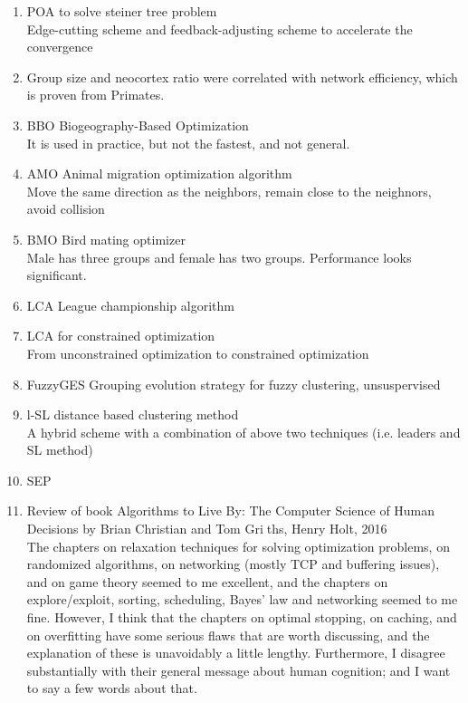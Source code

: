 \documentclass[a4paper,12pt]{article}
\begin{document}
\begin{enumerate}
	\item POA to solve steiner tree problem \cite{Liu_Physarum_2015}
	\\Edge-cutting scheme and feedback-adjusting scheme to accelerate the convergence
	
	\item Group size and neocortex ratio were correlated with network efficiency, which is proven from Primates. \cite{Pasquaretta_Social_2014}
		
	\item BBO Biogeography-Based Optimization\cite{Simon_Biogeography_2008}
	\\It is used in practice, but not the fastest, and not general.
	
	\item AMO Animal migration optimization algorithm \cite{Li_Animal_2014}
	\\Move the same direction as the neighbors, remain close to the neighnors, avoid collision

 	\item BMO Bird mating optimizer\cite{Askarzadeh_Bird_2014}
 	\\Male has three groups and female has two groups. Performance looks significant.
 	
	\item  LCA League championship algorithm \cite{Kashan_League_2009}
 	
	\item LCA  for constrained optimization\cite{Kashan_An_2011}
 	\\From unconstrained optimization to constrained optimization

 	\item  FuzzyGES Grouping evolution strategy for fuzzy clustering, unsuspervised \cite{Kashan_An_2013}

	\item l-SL distance based clustering method\cite{Patra_A_2011}
	\\A hybrid scheme with a combination of above two techniques (i.e. leaders and SL method)

 	\item SEP\cite{Gurrutxaga_SEP_2010}	
 
	\item Review of book   Algorithms  to  Live  By:  The  Computer  Science  of  Human  Decisions by  Brian  Christian  and  Tom  Griths,  Henry  Holt, 2016 \cite{Davis_Algorithms_2016}
	\\The  chapters  on  relaxation  techniques  for  solving  optimization  problems,  on  randomized  algorithms,  on  networking  (mostly  TCP  and  buffering  issues),  and  on  game theory  seemed  to  me  excellent,  and  the  chapters  on  explore/exploit,  sorting,  scheduling,  Bayes’  law  and  networking  seemed  to  me fine.  However,  I  think  that  the  chapters  on  optimal stopping,  on  caching,  and  on  overfitting  have  some  serious flaws  that  are  worth  discussing,  and  the  explanation  of  these  is  unavoidably  a  little  lengthy.  Furthermore,  I disagree  substantially  with  their  general  message  about  human  cognition;  and  I  want  to  say  a  few  words  about  that.
	

\end{enumerate}
\end{document}
